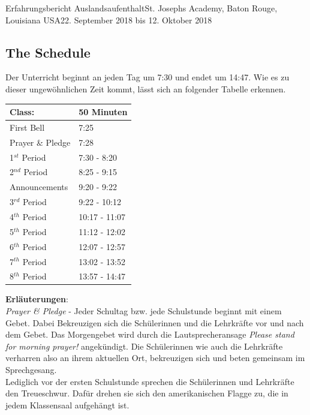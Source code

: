 \documentclass[oneside,openany,headings=optiontotoc,11pt,numbers=noenddot]{article}
\begin{document}
\begin{worksheet}{Erfahrungsbericht Auslandsaufenthalt}{St. Joseph\grq{}s Academy, Baton Rouge, Louisiana USA}{22. September 2018 bis 12. Oktober 2018}
		\subsection{The Schedule}
		Der Unterricht beginnt an jeden Tag um 7:30 und endet um 14:47. Wie es zu dieser ungewöhnlichen Zeit kommt, lässt sich an folgender Tabelle erkennen.\\
		\begin{center}
			\tiny
			\begin{tabularx}{0.5\textwidth}{X|X}
				Class: & 50 Minuten\\
				\hline
				\hline
				First Bell & 7:25\\
				Prayer \& Pledge & 7:28\\
				\hline
				1\(^{st}\) Period & 7:30 - 8:20\\
				2\(^{nd}\) Period & 8:25 - 9:15\\
				\hline
				Announcements & 9:20 - 9:22\\
				\hline
				3\(^{rd}\) Period & 9:22 - 10:12\\
				4\(^{th}\) Period & 10:17 - 11:07\\
				5\(^{th}\) Period & 11:12 - 12:02\\
				6\(^{th}\) Period & 12:07 - 12:57\\
				7\(^{th}\) Period & 13:02 - 13:52\\
				8\(^{th}\) Period & 13:57 - 14:47
			\end{tabularx}
		\end{center}
		\normalsize
		\small{\textbf{Erläuterungen}:\\
		\indent
		\textit{Prayer \& Pledge} - Jeder Schultag bzw. jede Schulstunde beginnt mit einem Gebet. Dabei Bekreuzigen sich die Schülerinnen und die Lehrkräfte vor und nach dem Gebet. Das Morgengebet wird durch die Lautsprecheransage \glqq{}\textit{Please stand for morning prayer!}\grqq{} angekündigt. Die Schülerinnen wie auch die Lehrkräfte verharren also an ihrem aktuellen Ort, bekreuzigen sich und beten gemeinsam im Sprechgesang.\\
		Lediglich vor der ersten Schulstunde sprechen die Schülerinnen und Lehrkräfte den Treueschwur. Dafür drehen sie sich den amerikanischen Flagge zu, die in jedem Klassensaal aufgehängt ist.
		\begin{center}
			\begin{minipage}{0.7\textwidth}
				\begin{center}
					\tiny
					

\end{center}
\end{minipage}
\end{center}}
\end{worksheet}
\end{document}
